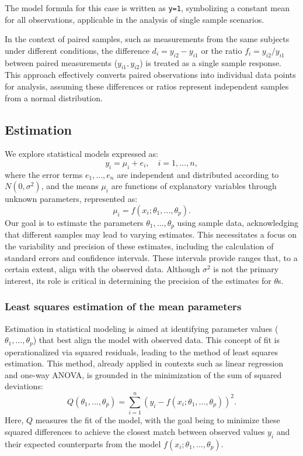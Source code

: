 \documentclass{article}
\begin{document}
The model formula for this case is written as \verb|y=1|, symbolizing a constant mean for all observations, applicable in the analysis of single sample scenarios.

In the context of paired samples, such as measurements from the same subjects under different conditions, the difference $d_i=y_{i2}-y_{i1}$ or the ratio $f_i=y_{i2}/y_{i1}$ between paired measurements ($y_{i1},y_{i2}$) is treated as a single sample response. This approach effectively converts paired observations into individual data points for analysis, assuming these differences or ratios represent independent samples from a normal distribution.

\subsection{Estimation}
We explore statistical models expressed as:
\begin{equation}
y_i = \mu_i + e_i, \quad i = 1, \ldots, n,
\end{equation}
where the error terms \(e_1, \ldots, e_n\) are independent and distributed according to \(N(0, \sigma^2)\), and the means \(\mu_i\) are functions of explanatory variables through unknown parameters, represented as:
\begin{equation}
\mu_i = f(x_i; \theta_1, \ldots, \theta_p).
\end{equation}
Our goal is to estimate the parameters \(\theta_1, \ldots, \theta_p\) using sample data, acknowledging that different samples may lead to varying estimates. This necessitates a focus on the variability and precision of these estimates, including the calculation of standard errors and confidence intervals. These intervals provide ranges that, to a certain extent, align with the observed data. Although \(\sigma^2\) is not the primary interest, its role is critical in determining the precision of the estimates for \(\theta\)s.

\subsubsection{Least squares estimation of the mean parameters}
Estimation in statistical modeling is aimed at identifying parameter values (\(\theta_1, \ldots, \theta_p\)) that best align the model with observed data. This concept of fit is operationalized via squared residuals, leading to the method of least squares estimation. This method, already applied in contexts such as linear regression and one-way ANOVA, is grounded in the minimization of the sum of squared deviations:
\begin{equation}
Q(\theta_1, \ldots, \theta_p) = \sum_{i=1}^{n} \left(y_i - f(x_i; \theta_1, \ldots, \theta_p)\right)^2.
\end{equation}
Here, \(Q\) measures the fit of the model, with the goal being to minimize these squared differences to achieve the closest match between observed values \(y_i\) and their expected counterparts from the model \(f(x_i; \theta_1, \ldots, \theta_p)\).
\end{document}
